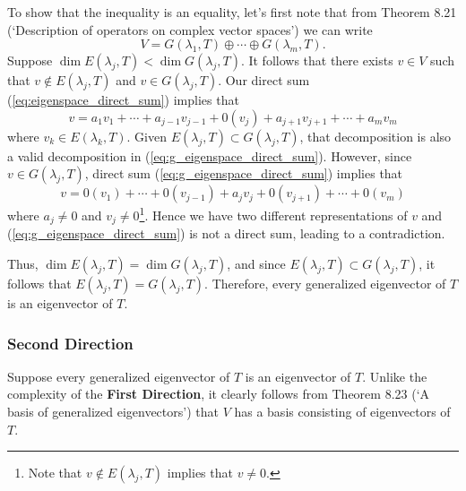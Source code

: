 \documentclass{article}
\begin{document}
To show that the inequality is an equality, let's first note that from Theorem 8.21 (`Description of operators on complex vector spaces') we can write
\begin{equation}\label{eq:g_eigenspace_direct_sum}
    V=G(\lambda_1,T)\oplus\cdots\oplus G(\lambda_m,T).
\end{equation}
Suppose $\operatorname{dim}E(\lambda_j,T)< \operatorname{dim}G(\lambda_j,T)$. 
It follows that there exists $v\in V$ such that $v\notin E(\lambda_j,T)$ and $v\in G(\lambda_j,T)$. 
Our direct sum (\ref{eq:eigenspace_direct_sum}) implies that 
\[v=a_1v_1+\cdots+a_{j-1}v_{j-1}+0(v_j)+a_{j+1}v_{j+1}+\cdots+a_mv_m\]
where $v_k\in E(\lambda_k,T)$. Given $E(\lambda_j,T)\subset G(\lambda_j,T)$, that decomposition is also a valid decomposition in (\ref{eq:g_eigenspace_direct_sum}).
However, since $v\in G(\lambda_j,T)$, direct sum (\ref{eq:g_eigenspace_direct_sum}) implies that
\[v=0(v_1)+\cdots+0(v_{j-1})+a_jv_j+0(v_{j+1})+\cdots+0(v_m)\]
where $a_j\neq 0$ and $v_j\neq 0$\footnote{Note that $v\notin E(\lambda_j,T)$ implies that $v\neq 0$.}. Hence we have two different representations of $v$ and (\ref{eq:g_eigenspace_direct_sum}) is not a direct sum, leading to a contradiction. 

Thus, $\operatorname{dim}E(\lambda_j,T)=\operatorname{dim}G(\lambda_j,T)$, and since $E(\lambda_j,T)\subset G(\lambda_j,T)$, it follows that $E(\lambda_j,T)=G(\lambda_j,T)$. Therefore, every generalized eigenvector of $T$ is an eigenvector of $T$.

\subsubsection*{Second Direction}
Suppose every generalized eigenvector of $T$ is an eigenvector of $T$. Unlike the complexity of the \textbf{First Direction}, it clearly follows from Theorem 8.23 (`A basis of generalized eigenvectors') that $V$ has a basis consisting of eigenvectors of $T$.
\end{document}
